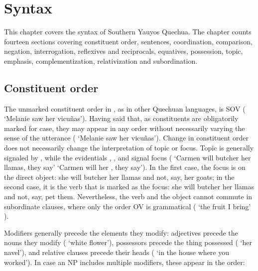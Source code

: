 \chapter{Syntax}\label{ch:syntax}
This chapter covers the syntax of Southern Yauyos Quechua. The chapter counts fourteen sections covering constituent order, sentences, coordination, comparison, negation, interrogation, reflexives and reciprocals, equatives, possession, topic, emphasis, complementization, relativization and subordination. 

\section{Constituent order}\label{sec:conord}
The unmarked constituent order in \SYQ, as in other Quechuan languages, is SOV (   ‘Melanie saw her vicuñas’). Having said that, as constituents are obligatorily marked for case, they may appear in any order without necessarily varying the sense of the utterance (   ‘Melanie saw her vicuñas’). Change in constituent order does not necessarily change the interpretation of topic or focus. Topic is generally signaled by , while the evidentials , , and  signal focus (   ‘Carmen will butcher her llamas, they say’    ‘Carmen will  her , they say’). In the first case, the focus is on the direct object: she will butcher her llamas and not, say, her goats; in the second case, it is the verb that is marked as the focus: she will butcher her llamas and not, say, pet them. Nevertheless, the verb and the object cannot commute in subordinate clauses, where only the order OV is grammatical (  ‘the fruit I bring’  ).

Modifiers generally precede the elements they modify: adjectives precede the nouns they modify (  ‘white flower’), possessors precede the thing possessed (  ‘her navel’), and relative clauses precede their heads (  ‘in the house where you worked’). In case an NP includes multiple modifiers, these appear in the order:

